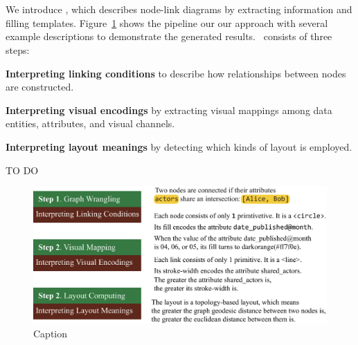 \section{\ApproachName}
We introduce \ApproachName, which describes node-link diagrams by extracting information and filling templates.
Figure~\ref{fig:workflow} shows the pipeline our our approach with several example descriptions to demonstrate the generated results.
\ApproachName~consists of three steps:
\begin{compactenum}
\item \textbf{Interpreting linking conditions} to describe how relationships between nodes are constructed.
\item \textbf{Interpreting visual encodings} by extracting visual mappings among data entities, attributes, and visual channels.
\item \textbf{Interpreting layout meanings} by detecting which kinds of layout is employed.
\end{compactenum}

{\color{red} TO DO}

\begin{figure}
    \centering
    \includegraphics[width=1\columnwidth]{figures/workflow.eps}
    \caption{Caption}
    \label{fig:workflow}
\end{figure}


